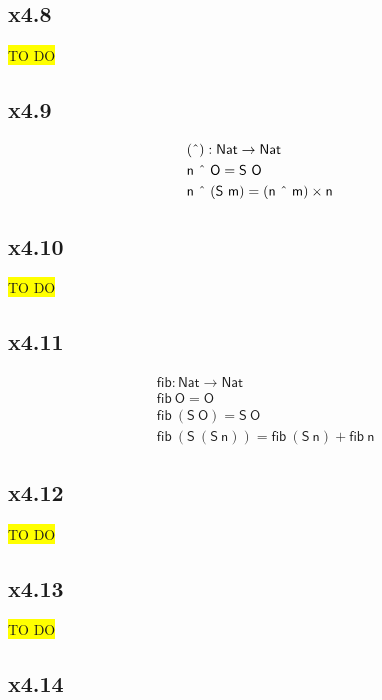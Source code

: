 \documentclass[portuguese,a4paper,12pt]{article}
\begin{document}
	\subsection*{x4.8}
	
	\colorbox{yellow}{TO DO}
	
	\subsection*{x4.9}
	
	\begin{align*}
		& \mathsf{(\text{\^{}}) : Nat \to Nat} \\
		& \mathsf{n \ \text{\^{}}\ O = S\ O} \\
		& \mathsf{n\ \text{\^{}}\ (S\ m) = (n\ \text{\^{}}\ m) \times n}
	\end{align*}
	
	\subsection*{x4.10}
	
	\colorbox{yellow}{TO DO}
	
	\subsection*{x4.11}
	
	\begin{align*}
		& \mathsf{fib : Nat \to Nat} \\
		& \mathsf{fib\ O = O} \\
		& \mathsf{fib\ (S\ O) = S\ O} \\
		& \mathsf{fib\ (S\ (S\ n)) = fib\ (S\ n) + fib\ n}
	\end{align*}
	
	\subsection*{x4.12}
	
	\colorbox{yellow}{TO DO}
	
	\subsection*{x4.13}
	
	\colorbox{yellow}{TO DO}
	
	\subsection*{x4.14}
	
\end{document}
